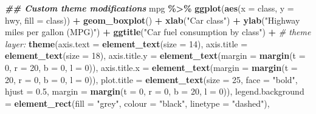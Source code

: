 \documentclass[
]{article}
\newenvironment{Shaded}{\begin{snugshade}}{\end{snugshade}}
\newcommand{\AttributeTok}[1]{\textcolor[rgb]{0.13,0.29,0.53}{#1}}
\newcommand{\CommentTok}[1]{\textcolor[rgb]{0.56,0.35,0.01}{\textit{#1}}}
\newcommand{\DecValTok}[1]{\textcolor[rgb]{0.00,0.00,0.81}{#1}}
\newcommand{\DocumentationTok}[1]{\textcolor[rgb]{0.56,0.35,0.01}{\textbf{\textit{#1}}}}
\newcommand{\FloatTok}[1]{\textcolor[rgb]{0.00,0.00,0.81}{#1}}
\newcommand{\FunctionTok}[1]{\textcolor[rgb]{0.13,0.29,0.53}{\textbf{#1}}}
\newcommand{\NormalTok}[1]{#1}
\newcommand{\SpecialCharTok}[1]{\textcolor[rgb]{0.81,0.36,0.00}{\textbf{#1}}}
\newcommand{\StringTok}[1]{\textcolor[rgb]{0.31,0.60,0.02}{#1}}
\begin{document}
\begin{Shaded}
\begin{Highlighting}[]
\DocumentationTok{\#\# Custom theme modifications}
\NormalTok{mpg }\SpecialCharTok{\%\textgreater{}\%} 
  \FunctionTok{ggplot}\NormalTok{(}\FunctionTok{aes}\NormalTok{(}\AttributeTok{x =}\NormalTok{ class,}
             \AttributeTok{y =}\NormalTok{ hwy,}
             \AttributeTok{fill =}\NormalTok{ class)) }\SpecialCharTok{+}
  \FunctionTok{geom\_boxplot}\NormalTok{() }\SpecialCharTok{+}
  \FunctionTok{xlab}\NormalTok{(}\StringTok{"Car class"}\NormalTok{) }\SpecialCharTok{+}
  \FunctionTok{ylab}\NormalTok{(}\StringTok{"Highway miles per gallon (MPG)"}\NormalTok{) }\SpecialCharTok{+}
  \FunctionTok{ggtitle}\NormalTok{(}\StringTok{"Car fuel consumption by class"}\NormalTok{) }\SpecialCharTok{+}
  \CommentTok{\# theme layer:}
  \FunctionTok{theme}\NormalTok{(}\AttributeTok{axis.text =} \FunctionTok{element\_text}\NormalTok{(}\AttributeTok{size =} \DecValTok{14}\NormalTok{),}
        \AttributeTok{axis.title =} \FunctionTok{element\_text}\NormalTok{(}\AttributeTok{size =} \DecValTok{18}\NormalTok{),}
        \AttributeTok{axis.title.y =} \FunctionTok{element\_text}\NormalTok{(}\AttributeTok{margin =} \FunctionTok{margin}\NormalTok{(}\AttributeTok{t =} \DecValTok{0}\NormalTok{, }\AttributeTok{r =} \DecValTok{20}\NormalTok{, }\AttributeTok{b =} \DecValTok{0}\NormalTok{, }\AttributeTok{l =} \DecValTok{0}\NormalTok{)),}
        \AttributeTok{axis.title.x =} \FunctionTok{element\_text}\NormalTok{(}\AttributeTok{margin =} \FunctionTok{margin}\NormalTok{(}\AttributeTok{t =} \DecValTok{20}\NormalTok{, }\AttributeTok{r =} \DecValTok{0}\NormalTok{, }\AttributeTok{b =} \DecValTok{0}\NormalTok{, }\AttributeTok{l =} \DecValTok{0}\NormalTok{)),}
        \AttributeTok{plot.title =} \FunctionTok{element\_text}\NormalTok{(}\AttributeTok{size =} \DecValTok{25}\NormalTok{, }
                                  \AttributeTok{face =} \StringTok{"bold"}\NormalTok{, }
                                  \AttributeTok{hjust =} \FloatTok{0.5}\NormalTok{,}
                                  \AttributeTok{margin =} \FunctionTok{margin}\NormalTok{(}\AttributeTok{t =} \DecValTok{0}\NormalTok{, }\AttributeTok{r =} \DecValTok{0}\NormalTok{, }\AttributeTok{b =} \DecValTok{20}\NormalTok{, }\AttributeTok{l =} \DecValTok{0}\NormalTok{)), }
        \AttributeTok{legend.background =} \FunctionTok{element\_rect}\NormalTok{(}\AttributeTok{fill =} \StringTok{"grey"}\NormalTok{, }
                                         \AttributeTok{colour =} \StringTok{"black"}\NormalTok{, }
                                         \AttributeTok{linetype =} \StringTok{"dashed"}\NormalTok{),}

\end{Highlighting}
\end{Shaded}
\end{document}
